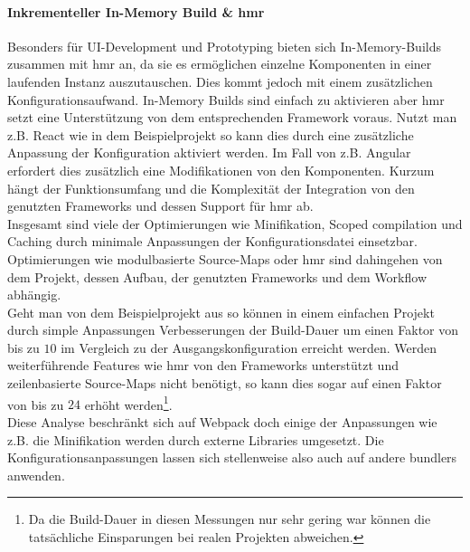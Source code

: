 \documentclass[11pt]{report}
\begin{document}
			\paragraph{Inkrementeller In-Memory Build \& \Gls{hmr}} Besonders für UI-Development und Prototyping bieten sich In-Memory-Builds zusammen mit \Gls{hmr} an, da sie es ermöglichen einzelne Komponenten in einer laufenden Instanz auszutauschen. Dies kommt jedoch mit einem zusätzlichen Konfigurationsaufwand. In-Memory Builds sind einfach zu aktivieren aber \Gls{hmr} setzt eine Unterstützung von dem entsprechenden Framework voraus. Nutzt man z.B. React wie in dem Beispielprojekt so kann dies durch eine zusätzliche Anpassung der Konfiguration aktiviert werden. Im Fall von z.B. Angular erfordert dies zusätzlich eine Modifikationen von den Komponenten\cite{frameworks:angular-hmr}. Kurzum hängt der Funktionsumfang und die Komplexität der Integration von den genutzten Frameworks und dessen Support für \Gls{hmr} ab.\\
			
			Insgesamt sind viele der Optimierungen wie Minifikation, Scoped compilation und Caching durch minimale Anpassungen der Konfigurationsdatei einsetzbar. Optimierungen wie modulbasierte Source-Maps oder \Gls{hmr} sind dahingehen von dem Projekt, dessen Aufbau, der genutzten Frameworks und dem Workflow abhängig.\\
			Geht man von dem Beispielprojekt aus so können in einem einfachen Projekt durch simple Anpassungen Verbesserungen der Build-Dauer um einen Faktor von bis zu $10$ im Vergleich zu der Ausgangskonfiguration erreicht werden. Werden weiterführende Features wie \Gls{hmr} von den Frameworks unterstützt und zeilenbasierte Source-Maps nicht benötigt, so kann dies sogar auf einen Faktor von bis zu $24$ erhöht werden\footnote{Da die Build-Dauer in diesen Messungen nur sehr gering war können die tatsächliche Einsparungen bei realen Projekten abweichen.}.\\
			Diese Analyse beschränkt sich auf Webpack doch einige der Anpassungen wie z.B. die Minifikation\cite{frameworks:uglifyJS} werden durch externe Libraries umgesetzt. Die Konfigurationsanpassungen lassen sich stellenweise also auch auf andere \Glspl{bundler} anwenden.
\end{document}

